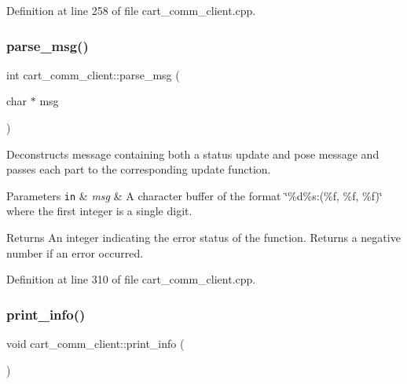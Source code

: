 Definition at line 258 of file cart\+\_\+comm\+\_\+client.\+cpp.

\mbox{\label{classcart__comm__client_af4d47a079f2b85d4e26e08c1e6950b5b}} 
\subsubsection{\texorpdfstring{parse\+\_\+msg()}{parse\_msg()}}
{\footnotesize\ttfamily int cart\+\_\+comm\+\_\+client\+::parse\+\_\+msg (\begin{DoxyParamCaption}\item[{char $\ast$}]{msg }\end{DoxyParamCaption})}

Deconstructs message containing both a status update and pose message and passes each part to the corresponding update function. 
\begin{DoxyParams}[1]{Parameters}
\mbox{\tt in}  & {\em msg} & A character buffer of the format \char`\"{}\%d\%s\+:(\%f, \%f, \%f)\char`\"{} where the first integer is a single digit. \\
\hline
\end{DoxyParams}
\begin{DoxyReturn}{Returns}
An integer indicating the error status of the function. Returns a negative number if an error occurred. 
\end{DoxyReturn}


Definition at line 310 of file cart\+\_\+comm\+\_\+client.\+cpp.

\mbox{\label{classcart__comm__client_a1b98c6cdf26eea214854b6eec41486a8}} 
\subsubsection{\texorpdfstring{print\+\_\+info()}{print\_info()}}
{\footnotesize\ttfamily void cart\+\_\+comm\+\_\+client\+::print\+\_\+info (\begin{DoxyParamCaption}{ }\end{DoxyParamCaption})}

